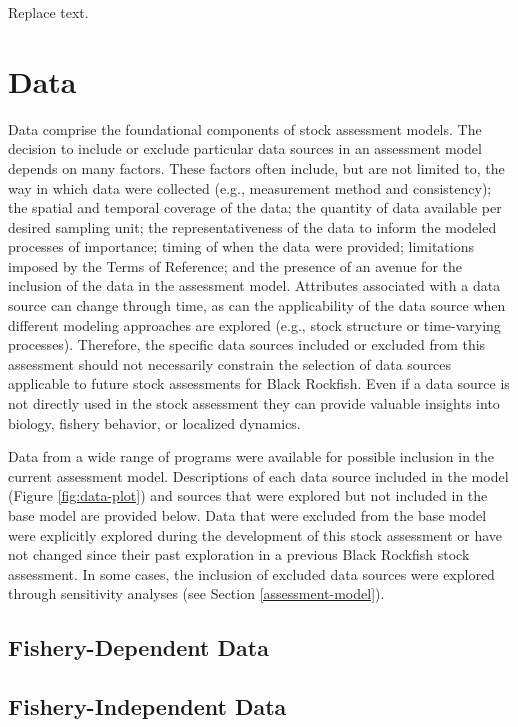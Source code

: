 \documentclass[11pt,
  english,
  letterpaper,
]{article}
\begin{document}
Replace text.

\hypertarget{data}{%
\section{Data}\label{data}}

Data comprise the foundational components of stock assessment models. The decision to include or exclude particular data sources in an assessment model depends on many factors. These factors often include, but are not limited to, the way in which data were collected (e.g., measurement method and consistency); the spatial and temporal coverage of the data; the quantity of data available per desired sampling unit; the representativeness of the data to inform the modeled processes of importance; timing of when the data were provided; limitations imposed by the Terms of Reference; and the presence of an avenue for the inclusion of the data in the assessment model. Attributes associated with a data source can change through time, as can the applicability of the data source when different modeling approaches are explored (e.g., stock structure or time-varying processes). Therefore, the specific data sources included or excluded from this assessment should not necessarily constrain the selection of data sources applicable to future stock assessments for Black Rockfish. Even if a data source is not directly used in the stock assessment they can provide valuable insights into biology, fishery behavior, or localized dynamics.

Data from a wide range of programs were available for possible inclusion in the current assessment model. Descriptions of each data source included in the model (Figure \ref{fig:data-plot}) and sources that were explored but not included in the base model are provided below. Data that were excluded from the base model were explicitly explored during the development of this stock assessment or have not changed since their past exploration in a previous Black Rockfish stock assessment. In some cases, the inclusion of excluded data sources were explored through sensitivity analyses (see Section \ref{assessment-model}).

\hypertarget{fishery-dependent-data}{%
\subsection{Fishery-Dependent Data}\label{fishery-dependent-data}}

\hypertarget{fishery-independent-data}{%
\subsection{Fishery-Independent Data}\label{fishery-independent-data}}
\end{document}
